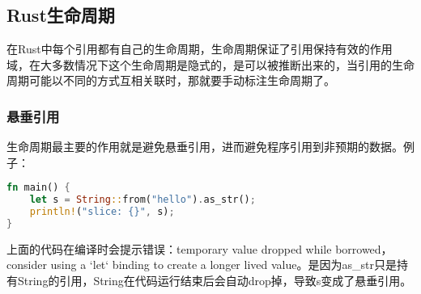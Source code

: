 \documentclass[../../../dolphin-book-2023.tex]{subfiles}
\begin{document}
\subsection{Rust生命周期}

在Rust中每个引用都有自己的生命周期，生命周期保证了引用保持有效的作用域，在大多数情况下这个生命周期是隐式的，是可以被推断出来的，当引用的生命周期可能以不同的方式互相关联时，那就要手动标注生命周期了。

\subsubsection{悬垂引用}

生命周期最主要的作用就是避免悬垂引用，进而避免程序引用到非预期的数据。例子：

\begin{lstlisting}[language=Rust]
fn main() {
    let s = String::from("hello").as_str();
    println!("slice: {}", s); 
}
\end{lstlisting}

上面的代码在编译时会提示错误：temporary value dropped while borrowed，consider using a `let` binding to create a longer lived value。是因为as\_str只是持有String的引用，String在代码运行结束后会自动drop掉，导致s变成了悬垂引用。
\end{document}
